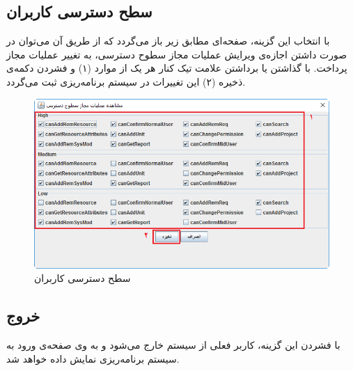 \subsection{سطح دسترسی کاربران}
با انتخاب این گزینه، صفحه‌ای مطابق زیر باز می‌گردد که از طریق آن می‌توان در صورت داشتن اجازه‌ی ویرایش عملیات مجاز سطوح دسترسی، به تغییر عملیات مجاز پرداخت. با گذاشتن یا برداشتن علامت تیک کنار هر یک از موارد (۱) و فشردن دکمه‌ی ذخیره (۲) این تغییرات در سیستم برنامه‌ریزی ثبت می‌گردد.

	\begin{figure}[H]
		\centering
		\includegraphics[scale=0.7]{img/manual/ac}
		\caption{سطح دسترسی کاربران}
	\end{figure}

	
\subsection{خروج}
با فشردن این گزینه، کاربر فعلی از سیستم خارج می‌شود و به وی صفحه‌ی ورود به سیستم برنامه‌ریزی نمایش داده خواهد شد.
